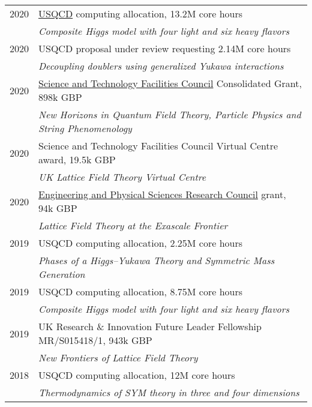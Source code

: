 \documentclass[10 pt]{article}
\begin{document}
\vspace{-12 pt} %
\begin{tabular}[t]{cl}
  2020 & \href{http://www.usqcd.org}{USQCD} computing allocation, 13.2M core hours                            \\ %
       & \textit{Composite Higgs model with four light and six heavy flavors}                                 \\[6 pt]
  2020 & USQCD proposal under review requesting 2.14M core hours                                              \\ %
       & \textit{Decoupling doublers using generalized Yukawa interactions}                                   \\[6 pt]
  2020 & \href{https://stfc.ukri.org}{Science and Technology Facilities Council} Consolidated Grant, 898k GBP \\
       & \textit{New Horizons in Quantum Field Theory, Particle Physics and String Phenomenology}             \\[6 pt]
  2020 & Science and Technology Facilities Council Virtual Centre award, 19.5k GBP                            \\
       & \textit{UK Lattice Field Theory Virtual Centre}                                                      \\[6 pt]
  2020 & \href{https://epsrc.ukri.org}{Engineering and Physical Sciences Research Council} grant, 94k GBP     \\
       & \textit{Lattice Field Theory at the Exascale Frontier}                                               \\[6 pt]
  2019 & USQCD computing allocation, 2.25M core hours                                                         \\ %
       & \textit{Phases of a Higgs--Yukawa Theory and Symmetric Mass Generation}                              \\[6 pt]
  2019 & USQCD computing allocation, 8.75M core hours                                                         \\ %
       & \textit{Composite Higgs model with four light and six heavy flavors}                                 \\[6 pt]
  2019 & UK Research \& Innovation Future Leader Fellowship {MR/S015418/1}, 943k GBP                          \\
       & \textit{New Frontiers of Lattice Field Theory}                                                       \\[6 pt]
  2018 & USQCD computing allocation, 12M core hours                                                           \\ %
       & \textit{Thermodynamics of SYM theory in three and four dimensions}                                   \\
\end{tabular}
\end{document}
